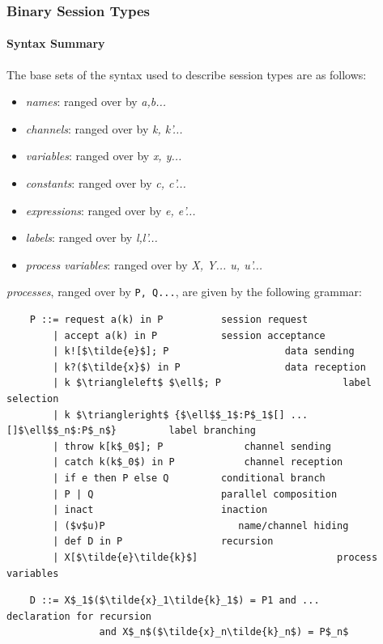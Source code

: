 \documentclass[11pt]{scrartcl}
\begin{document}

\subsubsection{Binary Session Types}
\paragraph{Syntax Summary}

The base sets of the syntax used to describe session types are as follows:

\begin{itemize}[noitemsep]
	\item[] \emph{names}: ranged over by \emph{a,b...}
	\item[] \emph{channels}: ranged over by \emph{k, k'...}
	\item[] \emph{variables}: ranged over by \emph{x, y...}
	\item[] \emph{constants}: ranged over by \emph{c, c'...}
	\item[] \emph{expressions}: ranged over by \emph{e, e'...}
	\item[] \emph{labels}: ranged over by \emph{l,l'...}
	\item[] \emph{process variables}: ranged over by \emph{X, Y... u, u'...}
\end{itemize}

\emph{processes}, ranged over by \texttt{P, Q...}, are given by the following 
grammar:
\\

\begin{lstlisting}
    P ::= request a(k) in P          session request
        | accept a(k) in P           session acceptance
        | k![$\tilde{e}$]; P                    data sending
        | k?($\tilde{x}$) in P                  data reception
        | k $\triangleleft$ $\ell$; P                     label selection
        | k $\triangleright$ {$\ell$$_1$:P$_1$[] ... []$\ell$$_n$:P$_n$}         label branching
        | throw k[k$_0$]; P              channel sending
        | catch k(k$_0$) in P            channel reception
        | if e then P else Q         conditional branch
        | P | Q                      parallel composition
        | inact                      inaction
        | ($v$u)P                       name/channel hiding
        | def D in P                 recursion
        | X[$\tilde{e}\tilde{k}$]                        process variables
\end{lstlisting}
\begin{lstlisting}
    D ::= X$_1$($\tilde{x}_1\tilde{k}_1$) = P1 and ...           declaration for recursion
                and X$_n$($\tilde{x}_n\tilde{k}_n$) = P$_n$ 
\end{lstlisting}
\end{document}
